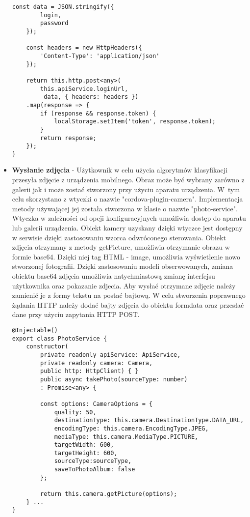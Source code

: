 \begin{itemize}
\begin{lstlisting}[caption=Metoda autoryzacji urządzenia mobilnego.]
	const data = JSON.stringify({
		login,
		password
	});
	
	const headers = new HttpHeaders({ 
		'Content-Type': 'application/json' 
	});
	
	return this.http.post<any>(
		this.apiService.loginUrl,
		 data, { headers: headers })
	.map(response => {
		if (response && response.token) {
			localStorage.setItem('token', response.token);
		}
		return response;
	});
}
\end{lstlisting} 


\item \textbf{Wysłanie zdjęcia} - Użytkownik w celu użycia algorytmów klasyfikacji przesyła zdjęcie z urządzenia mobilnego. Obraz może być wybrany zarówno z galerii jak i może zostać stworzony przy użyciu aparatu urządzenia. W~tym celu skorzystano z wtyczki o nazwie "cordova-plugin-camera". Implementacja metody używającej jej została stworzona w klasie o nazwie "photo-service". Wtyczka w zależności od opcji konfiguracyjnych umożliwia dostęp do aparatu lub galerii urządzenia. Obiekt kamery uzyskany dzięki wtyczce jest dostępny w serwisie dzięki zastosowaniu wzorca odwróconego sterowania. Obiekt zdjęcia otrzymany z metody getPicture, umożliwia otrzymanie obrazu w formie base64. Dzięki niej tag HTML - image, umożliwia wyświetlenie nowo stworzonej fotografii. Dzięki zastosowaniu modeli obserwowanych, zmiana obiektu base64 zdjęcia umożliwia natychmiastową zmianę interfejsu użytkownika oraz pokazanie zdjecia. Aby wysłać otrzymane zdjęcie należy zamienić je z formy tekstu na postać bajtową. W celu stworzenia poprawnego żądania HTTP należy dodać bajty zdjęcia do obiektu formdata oraz przesłać dane przy użyciu zapytania HTTP POST.



\begin{lstlisting}[caption=Wykorzystanie wtyczki w celu prezentacji zdjecia.]
@Injectable()
export class PhotoService {
	constructor(
		private readonly apiService: ApiService,
		private readonly camera: Camera,
		public http: HttpClient) { }	
		public async takePhoto(sourceType: number)
		: Promise<any> {
	
		const options: CameraOptions = {
			quality: 50,
			destinationType: this.camera.DestinationType.DATA_URL,
			encodingType: this.camera.EncodingType.JPEG,
			mediaType: this.camera.MediaType.PICTURE,
			targetWidth: 600,
			targetHeight: 600,
			sourceType:sourceType,
			saveToPhotoAlbum: false
		};		
		
		return this.camera.getPicture(options);
	} ...
}
\end{lstlisting} 


\end{itemize}
